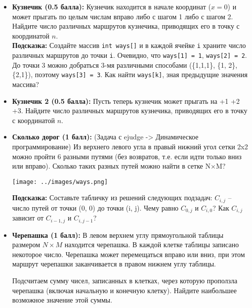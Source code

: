 \documentclass{article}
\begin{document}
\begin{itemize}
\item \textbf{Кузнечик (0.5 балла):} Кузнечик находится в начале координат ($x = 0$) и может прыгать по целым числам вправо либо с шагом 1 либо с шагом 2. Найдите число различных маршрутов кузнечика, приводящих его в точку с координатой $n$. \\
\textbf{Подсказка:} Создайте массив \texttt{int ways[]} и в каждой ячейке \texttt{i} храните число различных маршрутов до точки \texttt{i}. Очевидно, что \texttt{ways[1] = 1}, \texttt{ways[2] = 2}. До точки 3 можно добраться 3-мя различными способами (\{1,1,1\}, \{1, 2\}, \{2,1\}), поэтому \texttt{ways[3] = 3}. Как найти \texttt{ways[k]}, зная предыдущие значения массива?
 \item \textbf{Кузнечик 2 (0.5 балла):} Пусть теперь кузнечик может прыгать на +1 +2 +3. Найдите число различных маршрутов кузнечика, приводящих его в точку с координатой $n$.

\item \textbf{Сколько дорог (1 балл):}
(Задача с ejudge -> Динамическое программирование) Из верхнего левого угла в правый нижний угол сетки 2x2 можно пройти 6 разными путями (без возвратов, т.е. если идти только вниз или вправо). Сколько таких разных путей можно найти в сетке N×M?
\begin{center}
\texttt{[image: ../images/ways.png]}
\end{center}
\textbf{Подсказка:} Составьте табличку из решений следующих подзадач: $C_{i, j}$ -- число путей от точки (0, 0) до точки (i, j). Чему равно $C_{0, j}$ и $C_{i, 0}$? Как $C_{i, j}$ зависит от $C_{i-1, j}$ и $C_{i, j-1}$?

\item \textbf{Черепашка (1 балл):}
В левом верхнем углу прямоугольной таблицы размером $N \times M$ находится черепашка. В каждой клетке таблицы записано некоторое число. Черепашка может перемещаться вправо или вниз, при этом маршрут черепашки заканчивается в правом нижнем углу таблицы.

Подсчитаем сумму чисел, записанных в клетках, через которую проползла черепашка (включая начальную и конечную клетку). Найдите наибольшее возможное значение этой суммы.


\end{itemize}
\end{document}
